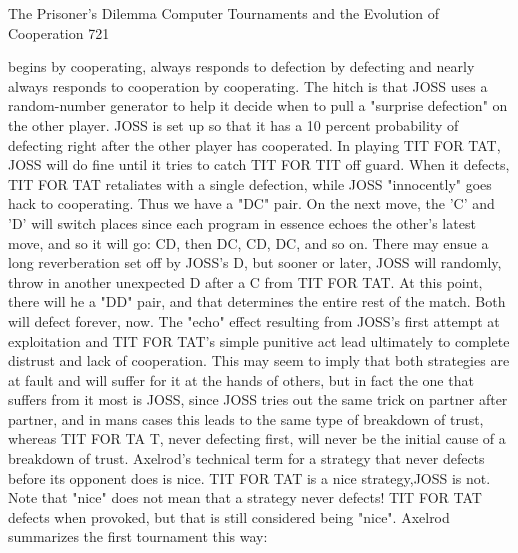 The Prisoner's Dilemma Computer Tournaments and the Evolution of Cooperation               721

begins by cooperating, always responds to defection by defecting and nearly always
responds to cooperation by cooperating. The hitch is that JOSS uses a random-number
generator to help it decide when to pull a "surprise defection" on the other player. JOSS
is set up so that it has a 10 percent probability of defecting right after the other player has
cooperated.
         In playing TIT FOR TAT, JOSS will do fine until it tries to catch TIT FOR TIT
off guard. When it defects, TIT FOR TAT retaliates with a single defection, while JOSS
"innocently" goes hack to cooperating. Thus we have a "DC" pair. On the next move, the
'C' and 'D' will switch places since each program in essence echoes the other's latest
move, and so it will go: CD, then DC, CD, DC, and so on. There may ensue a long
reverberation set off by JOSS's D, but sooner or later, JOSS will randomly, throw in
another unexpected D after a C from TIT FOR TAT. At this point, there will he a "DD"
pair, and that determines the entire rest of the match. Both will defect forever, now. The
"echo" effect resulting from JOSS's first attempt at exploitation and TIT FOR TAT's
simple punitive act lead ultimately to complete distrust and lack of cooperation.
         This may seem to imply that both strategies are at fault and will suffer for it at the
hands of others, but in fact the one that suffers from it most is JOSS, since JOSS tries out
the same trick on partner after partner, and in mans cases this leads to the same type of
breakdown of trust, whereas TIT FOR TA T, never defecting first, will never be the
initial cause of a breakdown of trust. Axelrod's technical term for a strategy that never
defects before its opponent does is nice. TIT FOR TAT is a nice strategy,JOSS is not.
Note that "nice" does not mean that a strategy never defects! TIT FOR TAT defects when
provoked, but that is still considered being "nice".
         Axelrod summarizes the first tournament this way:

